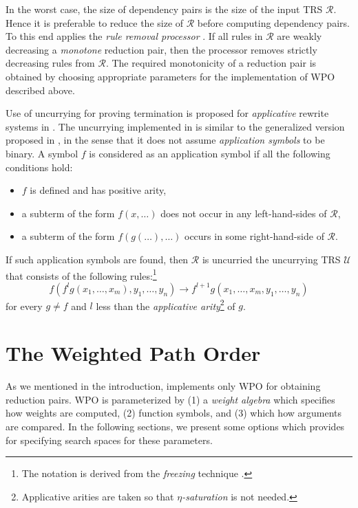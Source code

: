 \documentclass{llncs}
\def\RR{{\mathcal{R}}}
\def\UU{{\mathcal{U}}}
\begin{document}
	In the worst case, the size of dependency pairs is
	the size of the input TRS $\RR$.
	Hence it is preferable to reduce the size of $\RR$ before
	computing dependency pairs.
	To this end \NaTT applies the \emph{rule removal processor} \cite{GTS04}.
	If all rules in $\RR$ are weakly decreasing \wrt
	a \emph{monotone} reduction pair,
	then the processor removes strictly decreasing rules from $\RR$.
	The required monotonicity of a reduction pair is obtained by choosing
	appropriate parameters for the implementation of WPO described above.

	Use of uncurrying for proving termination is proposed for
	\emph{applicative} rewrite systems in \cite{HMZ13}.
	The uncurrying implemented in \NaTT is similar to the
	generalized version proposed in \cite{ST11},
	in the sense that it does not assume \emph{application symbols} to be binary.
	A symbol $f$ is considered as an application symbol if all the following
	conditions hold:
	\begin{itemize}
	\item $f$ is defined and has positive arity,
	\item
		a subterm of the form $f(x,\dots)$ does not occur
		in any left-hand-sides of $\RR$,
	\item
		a subterm of the form $f(g(\dots),\dots)$ occurs
		in some right-hand-side of $\RR$.
	\end{itemize}
	If such application symbols are found, then $\RR$ is uncurried \wrt
	the uncurrying TRS $\UU$ that consists of the following rules:\footnote{The notation is derived from the \emph{freezing} technique \cite{X98}.
}
	\[
		f(f^lg(x_1,\dots,x_m),y_1,\dots,y_n) \to f^{l+1}g(x_1,\dots,x_m,y_1,\dots,y_n)
	\]
	for every $g \neq f$ and $l$ less than the \emph{applicative arity}\footnote{Applicative arities are taken 
	so that \emph{$\eta$-saturation} is not needed.
} of $g$.


\section{The Weighted Path Order}
\label{sec:reduction}

As we mentioned in the introduction, \NaTT
implements only WPO for obtaining reduction pairs.
WPO is parameterized by
(1) a \emph{weight algebra} which specifies how weights are computed,
(2)  function symbols, and
(3)  which
 how arguments are compared.
In the following sections, we present some options which
\NaTT provides for specifying search spaces for these parameters.
\end{document}
